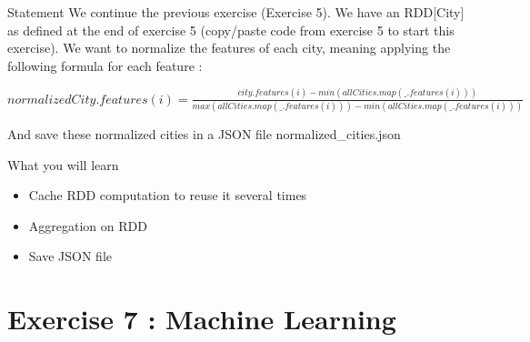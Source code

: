 \documentclass[slidetop,9pt,utf8]{beamer}
\begin{document}
\begin{CJK}{UTF8}{gbsn}
\begin{frame}
  \begin{block}{Statement}
    We continue the previous exercise (Exercise 5). We have an RDD[City] as defined at the end of exercise 5 (copy/paste code from exercise 5 to start this exercise). We want to normalize the features of each city, meaning applying the following formula for each feature :
\begin{center} 
    $normalizedCity.features(i) = \frac{city.features(i) - min(allCities.map(\_.features(i)))}{max(allCities.map(\_.features(i))) - min(allCities.map(\_.features(i)))}$
\end{center}
And save these normalized cities in a JSON file normalized\_cities.json
  \end{block}

  \begin{block}{What you will learn}
    \begin{itemize}
      \item Cache RDD computation to reuse it several times
      \item Aggregation on RDD
      \item Save JSON file
    \end{itemize}
  \end{block}

\end{frame}

\section{Exercise 7 : Machine Learning}


\end{CJK}
\end{document}
